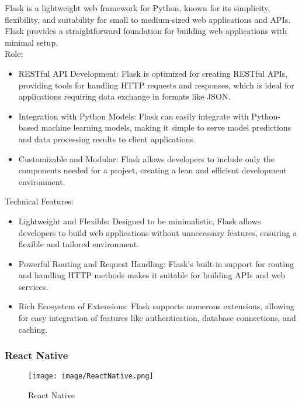 \documentclass[conference]{IEEEtran}
\begin{document}
\noindent Flask is a lightweight web framework for Python, known for its simplicity, flexibility, and suitability for small to medium-sized web applications and APIs. Flask provides a straightforward foundation for building web applications with minimal setup.\\

Role:
\begin{itemize}
    \item RESTful API Development: Flask is optimized for creating RESTful APIs, providing tools for handling HTTP requests and responses, which is ideal for applications requiring data exchange in formats like JSON.\\
    \item Integration with Python Models: Flask can easily integrate with Python-based machine learning models, making it simple to serve model predictions and data processing results to client applications.\\
    \item Customizable and Modular: Flask allows developers to include only the components needed for a project, creating a lean and efficient development environment.\\
\end{itemize}

Technical Features:
\begin{itemize}
    \item Lightweight and Flexible: Designed to be minimalistic, Flask allows developers to build web applications without unnecessary features, ensuring a flexible and tailored environment.\\
    \item Powerful Routing and Request Handling: Flask’s built-in support for routing and handling HTTP methods makes it suitable for building APIs and web services.\\
    \item Rich Ecosystem of Extensions: Flask supports numerous extensions, allowing for easy integration of features like authentication, database connections, and caching.\\
\end{itemize}


\subsubsection{React Native}

\begin{figure}[h!]
    \centering
    \texttt{[image: image/ReactNative.png]}
    \caption{React Native}
    \label{fig:enter-label}
\end{figure}
\end{document}
